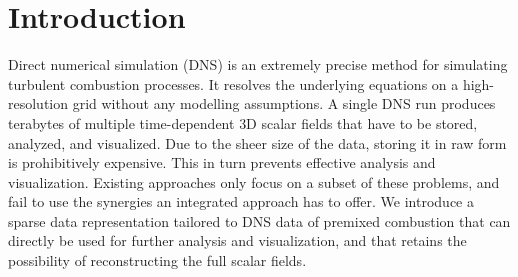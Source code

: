 
\section{Introduction}
\label{sec:intro}

Direct numerical simulation (\acs{DNS})  is an extremely precise
method for simulating turbulent combustion processes. It resolves the underlying
equations on a high-resolution grid without any modelling assumptions. A single
\ac{DNS} run produces terabytes of multiple time-dependent \ac{3D} scalar fields
that have to be stored, analyzed, and visualized. Due to the sheer size of the
data, storing it in raw form is prohibitively expensive. This in turn prevents
effective analysis and visualization. Existing approaches only focus on a subset
of these problems, and fail to use the synergies an integrated approach has to
offer. We introduce a sparse data representation tailored to \ac{DNS} data of
premixed combustion that can directly be used for further analysis and
visualization, and that retains the possibility of reconstructing the full
scalar fields.

%


